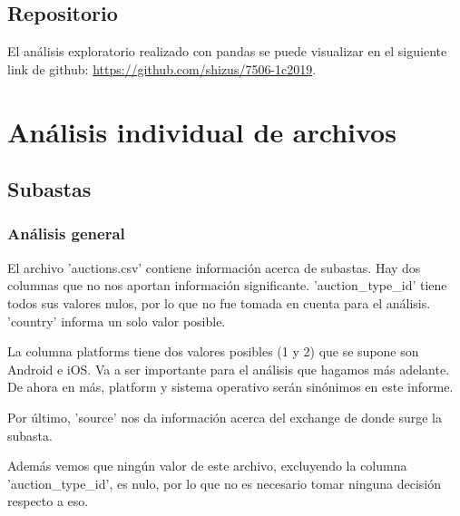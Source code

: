 \documentclass[a4paper, 12pt]{article}
\begin{document}
     \subsection{Repositorio}
     El análisis exploratorio realizado con pandas se puede visualizar en el siguiente link de github: \href{https://github.com/shizus/7506-1c2019}{https://github.com/shizus/7506-1c2019}.
\section{Análisis individual de archivos}
\subsection{Subastas}
	\subsubsection{Análisis general} \label{analisis general}
	  El archivo 'auctions.csv' contiene información acerca de subastas.
	Hay dos columnas que no nos aportan información significante. 'auction\_type\_id' tiene todos sus valores 		nulos, por lo que no fue tomada en cuenta para el análisis. 'country' informa un solo valor posible.

	 La columna platforms tiene dos valores posibles (1 y 2) que se supone son Android e iOS. Va a ser importante para el análisis que hagamos más adelante. De ahora en más, platform y sistema operativo serán sinónimos en este informe.

	 Por último, 'source' nos da información acerca del exchange de donde surge la subasta.

	 Además vemos que ningún valor de este archivo, excluyendo la columna 'auction\_type\_id', es nulo, por lo que no es necesario tomar ninguna decisión respecto a eso.
\end{document}
